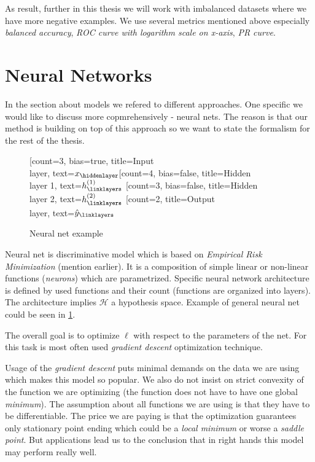 As result, further in this thesis we will work with imbalanced datasets where we have more negative examples. We use several metrics mentioned above especially \emph{balanced accuracy}, \emph{ROC curve with logarithm scale on x-axis}, \emph{PR curve}.

\section{Neural Networks}
In the section about models we refered to different approaches. One specific we would like to discuss more copmrehensively - neural nets. The reason is that our method is building on top of this approach so we want to state the formalism for the rest of the thesis.
\begin{figure}
    \centering
    \begin{neuralnetwork}[height=4]
        \newcommand{\x}[2]{$x_#2$}
        \newcommand{\y}[2]{$\hat{y}_#2$}
        \newcommand{\hfirst}[2]{\small $h^{(1)}_#2$}
        \newcommand{\hsecond}[2]{\small $h^{(2)}_#2$}
        [count=3, bias=true, title=Input\\layer, text=\x]
        \hiddenlayer[count=4, bias=false, title=Hidden\\layer 1, text=\hfirst] \linklayers
        \hiddenlayer[count=3, bias=false, title=Hidden\\layer 2, text=\hsecond] \linklayers
        \outputlayer[count=2, title=Output\\layer, text=\y] \linklayers
    \end{neuralnetwork}
    \caption{Neural net example}
    \label{fig:neuralnet}
\end{figure}

Neural net is discriminative model which is based on \emph{Empirical Risk Minimization} (mention earlier). It is a composition of simple linear or non-linear functions (\emph{neurons}) which are parametrized. Specific neural network architecture is defined by used functions and their count (functions are organized into layers). The architecture implies $\mathcal{H}$ a hypothesis space. Example of general neural net could be seen in \ref{fig:neuralnet}. 

The overall goal is to optimize $\ell$ with respect to the parameters of the net. For this task is most often used \emph{gradient descent} optimization technique.

Usage of the \emph{gradient descent} puts minimal demands on the data we are using which makes this model so popular. We also do not insist on strict convexity of the function we are optimizing (the function does not have to have one global \emph{minimum}). The assumption about all functions we are using is that they have to be differentiable. The price we are paying is that the optimization guarantees only stationary point ending which could be a \emph{local minimum} or worse a \emph{saddle point}. But applications lead us to the conclusion that in right hands this model may perform really well.

